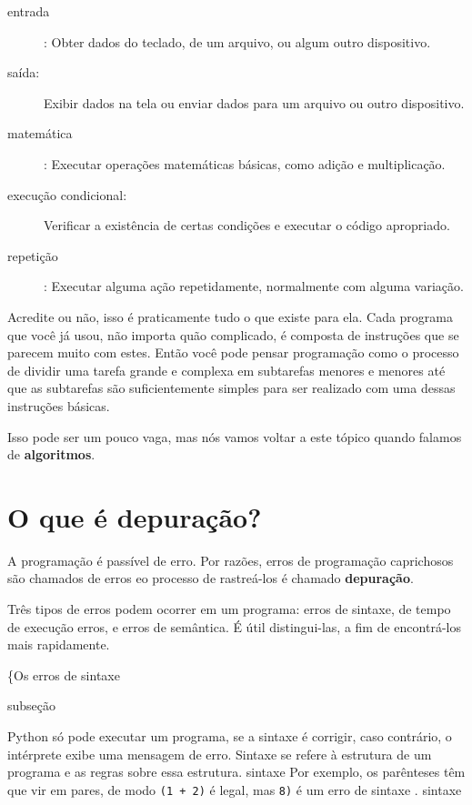 \documentclass[10pt]{book}
\begin{document}
{\begin{description}
\item[entrada]: Obter dados do teclado, de um arquivo, ou algum
outro dispositivo.

\item[saída:] Exibir dados na tela ou enviar dados para um
arquivo ou outro dispositivo.

\item[matemática]: Executar operações matemáticas básicas, como adição e
multiplicação.

\item[execução condicional:] Verificar a existência de certas condições e
executar o código apropriado.

\item[repetição]: Executar alguma ação repetidamente, normalmente com
alguma variação.

\end{description}

Acredite ou não, isso é praticamente tudo o que existe para ela. Cada
programa que você já usou, não importa quão complicado, é composta de
instruções que se parecem muito com estes. Então você pode pensar
programação como o processo de dividir uma tarefa grande e complexa
em subtarefas menores e menores até que as subtarefas são
suficientemente simples para ser realizado com uma dessas instruções básicas.

Isso pode ser um pouco vaga, mas nós vamos voltar a este tópico
quando falamos de {\bf algoritmos}.

\section{O que é depuração?}

A programação é passível de erro. Por razões, erros de programação caprichosos
são chamados de erros {\bf} eo processo de rastreá-los é chamado
{\bf depuração}.

Três tipos de erros podem ocorrer em um programa: erros de sintaxe, de tempo de execução 
erros, e erros de semântica. É útil
distingui-las, a fim de encontrá-los mais rapidamente.

\{Os erros de sintaxe} subseção

Python só pode executar um programa, se a sintaxe é
corrigir, caso contrário, o intérprete exibe uma mensagem de erro.
{\bf} Sintaxe se refere à estrutura de um programa e as regras sobre
essa estrutura. \index{} sintaxe
Por exemplo, os parênteses têm que vir em pares, de modo
{\tt (1 + 2)} é legal, mas {\tt 8)} é um erro de sintaxe {\bf}.
\index{} sintaxe
\end{document}
